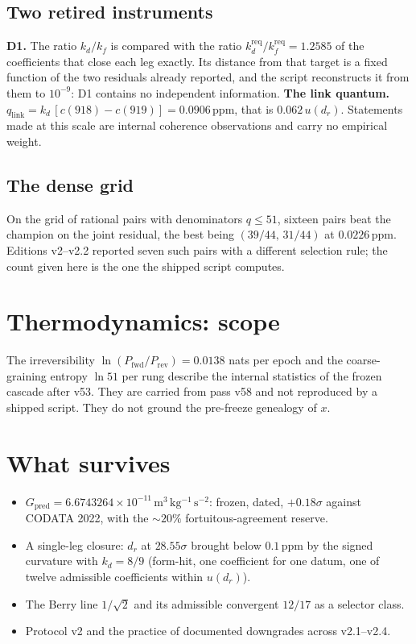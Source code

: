 \documentclass[11pt,a4paper]{article}
\newcommand{\ppm}{\ensuremath{\,\mathrm{ppm}}}
\begin{document}
\subsection{Two retired instruments}
\textbf{D1.} The ratio $k_d/k_f$ is compared with the ratio $k_d^{\mathrm{req}}/k_f^{\mathrm{req}} = 1.2585$ of the coefficients that close each leg exactly. Its distance from that target is a fixed function of the two residuals already reported, and the script reconstructs it from them to $10^{-9}$: D1 contains no independent information. \textbf{The link quantum.} $q_{\mathrm{link}} = k_d\,[c(918)-c(919)] = 0.0906\ppm$, that is $0.062\,u(d_r)$. Statements made at this scale are internal coherence observations and carry no empirical weight.

\subsection{The dense grid}
On the grid of rational pairs with denominators $q\le51$, sixteen pairs beat the champion on the joint residual, the best being $(39/44,\,31/44)$ at $0.0226\ppm$. Editions v2--v2.2 reported seven such pairs with a different selection rule; the count given here is the one the shipped script computes.

\section{Thermodynamics: scope}
The irreversibility $\ln(P_{\mathrm{fwd}}/P_{\mathrm{rev}}) = 0.0138$ nats per epoch and the coarse-graining entropy $\ln 51$ per rung describe the internal statistics of the frozen cascade after v53. They are carried from pass v58 and not reproduced by a shipped script. They do not ground the pre-freeze genealogy of $x$.

\section{What survives}
\begin{itemize}[leftmargin=1.4em,itemsep=1pt]
\item $G_{\mathrm{pred}} = 6.6743264\times10^{-11}\,\mathrm{m^3\,kg^{-1}\,s^{-2}}$: frozen, dated, $+0.18\sigma$ against CODATA 2022, with the $\sim 20\%$ fortuitous-agreement reserve.
\item A single-leg closure: $d_r$ at $28.55\sigma$ brought below $0.1\ppm$ by the signed curvature with $k_d = 8/9$ (form-hit, one coefficient for one datum, one of twelve admissible coefficients within $u(d_r)$).
\item The Berry line $1/\sqrt2$ and its admissible convergent $12/17$ as a selector class.
\item Protocol v2 and the practice of documented downgrades across v2.1--v2.4.
\end{itemize}
\end{document}
